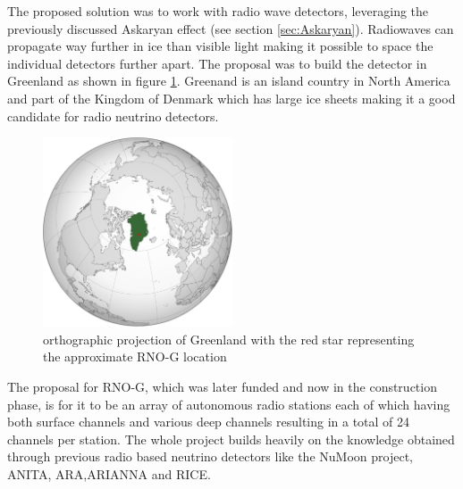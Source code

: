 The proposed solution was to work with radio wave detectors, leveraging the
previously discussed Askaryan effect (see section \ref{sec:Askaryan}).  Radiowaves can propagate
way further in ice than visible light making it possible to space the
individual detectors further apart. The proposal was to build the detector in Greenland as shown in figure \ref{fig:GreenlandOP}. Greenand is an
island country in North America and part of the Kingdom of Denmark which has
large ice sheets making it a good candidate for radio neutrino detectors.
\begin{figure}
  \centering
  \includegraphics[width=0.5\textwidth]{figures/GreenlandOP.pdf}
  \caption{orthographic projection of Greenland with the red star representing the approximate RNO-G location}
  \label{fig:GreenlandOP}
\end{figure}
The proposal for RNO-G, which was later funded and now in the construction
phase, is for it to be an array of autonomous radio stations each of which having both
surface channels and various deep channels resulting in a total of 24 channels
per station. The whole project builds heavily on the knowledge obtained through
previous radio based neutrino detectors like the NuMoon\cite{numoon} project,
ANITA\cite{ANITA}, ARA\cite{ARA},ARIANNA\cite{Barwick_2015} and RICE\cite{RICE}.

